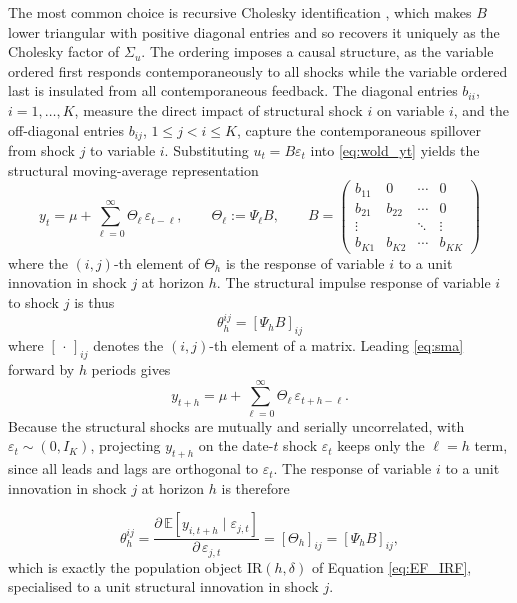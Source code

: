 The most common choice is recursive Cholesky identification \parencite{ramey2016macroeconomic},
which makes $B$ lower triangular with positive diagonal entries and so recovers it uniquely as
the Cholesky factor of $\Sigma_u$. The ordering imposes a causal structure, as the variable
ordered first responds contemporaneously to all shocks while the variable ordered last is
insulated from all contemporaneous feedback. The diagonal entries $b_{ii}$, $i = 1, \ldots, K$,
measure the direct impact of structural shock $i$ on variable $i$, and the off-diagonal entries
$b_{ij}$, $1 \leq j < i \leq K$, capture the contemporaneous spillover from shock $j$ to variable
$i$. Substituting $u_t = B\varepsilon_t$ into \eqref{eq:wold_yt} yields the structural
moving-average representation
%
\begin{equation}
    y_t = \mu + \sum_{\ell=0}^{\infty} \Theta_\ell\, \varepsilon_{t-\ell},
\qquad \Theta_\ell := \Psi_\ell B,
    \qquad B = \begin{pmatrix}
b_{11} & 0      & \cdots & 0      \\
b_{21} & b_{22} & \cdots & 0      \\
\vdots &        & \ddots & \vdots \\
b_{K1} & b_{K2} & \cdots & b_{KK}
\end{pmatrix}
    \label{eq:sma}
\end{equation}
%
where the $(i,j)$-th element of $\Theta_h$ is the response of variable $i$ to a unit innovation
in shock $j$ at horizon $h$. The structural impulse response of variable $i$ to shock $j$ is thus
%
\begin{equation}
    \theta_h^{ij} = [\Psi_h B]_{ij}
    \label{eq:sirf}
\end{equation}
%
where $[\,\cdot\,]_{ij}$ denotes the $(i,j)$-th element of a matrix. Leading \eqref{eq:sma}
forward by $h$ periods gives
%
\begin{equation}
    y_{t+h} = \mu + \sum_{\ell=0}^{\infty} \Theta_\ell\, \varepsilon_{t+h-\ell}.
    \label{eq:sma_forward}
\end{equation}
%
Because the structural shocks are mutually and serially uncorrelated, with
$\varepsilon_t \sim (0, I_K)$, projecting $y_{t+h}$ on the date-$t$ shock $\varepsilon_t$ keeps
only the $\ell = h$ term, since all leads and lags are orthogonal to $\varepsilon_t$. The
response of variable $i$ to a unit innovation in shock $j$ at horizon $h$ is therefore

\begin{equation}
\theta_h^{ij}
= \frac{\partial\, \mathbb{E}\!\left[y_{i,t+h} \mid \varepsilon_{j,t}\right]}
       {\partial\, \varepsilon_{j,t}}
= [\Theta_h]_{ij} = [\Psi_h B]_{ij},
\end{equation}
%
which is exactly the population object $\mathrm{IR}(h,\delta)$ of Equation \eqref{eq:EF_IRF},
specialised to a unit structural innovation in shock $j$.

